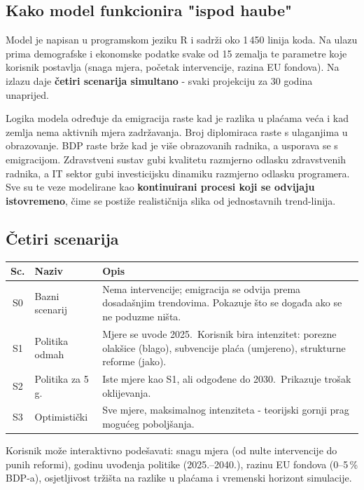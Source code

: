 \documentclass[11pt,a4paper]{article}
\begin{document}
\subsection*{Kako model funkcionira "ispod haube"}

Model je napisan u programskom jeziku R i sadrži oko 1\,450 linija koda. Na ulazu prima demografske i ekonomske podatke svake od 15 zemalja te parametre koje korisnik postavlja (snaga mjera, početak intervencije, razina EU fondova). Na izlazu daje \textbf{četiri scenarija simultano}  - svaki projekciju za 30 godina unaprijed.

Logika modela određuje da emigracija raste kad je razlika u plaćama veća i kad zemlja nema aktivnih mjera zadržavanja. Broj diplomiraca raste s ulaganjima u obrazovanje. BDP raste brže kad je više obrazovanih radnika, a usporava se s emigracijom. Zdravstveni sustav gubi kvalitetu razmjerno odlasku zdravstvenih radnika, a IT sektor gubi investicijsku dinamiku razmjerno odlasku programera. Sve su te veze modelirane kao \textbf{kontinuirani procesi koji se odvijaju istovremeno}, čime se postiže realističnija slika od jednostavnih trend-linija.

\subsection*{Četiri scenarija}

\begin{center}
\small
\begin{tabular}{clp{8.5cm}}
\toprule
\textbf{Sc.} & \textbf{Naziv} & \textbf{Opis} \\
\midrule
S0 & Bazni scenarij   & Nema intervencije; emigracija se odvija prema dosadašnjim trendovima. Pokazuje što se događa ako se ne poduzme ništa. \\[4pt]
S1 & Politika odmah   & Mjere se uvode 2025.\ Korisnik bira intenzitet: porezne olakšice (blago), subvencije plaća (umjereno), strukturne reforme (jako). \\[4pt]
S2 & Politika za 5 g. & Iste mjere kao S1, ali odgođene do 2030.\ Prikazuje trošak oklijevanja. \\[4pt]
S3 & Optimistički     & Sve mjere, maksimalnog intenziteta  - teorijski gornji prag mogućeg poboljšanja. \\
\bottomrule
\end{tabular}
\end{center}

\vspace{4pt}
Korisnik može interaktivno podešavati: snagu mjera (od nulte intervencije do punih reformi), godinu uvođenja politike (2025.–2040.), razinu EU fondova (0–5\,\% BDP-a), osjetljivost tržišta na razlike u plaćama i vremenski horizont simulacije.
\end{document}
